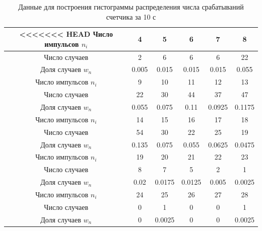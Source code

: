 \documentclass[a4paper,12pt]{article}
\begin{document}
\begin{table}[H]
\centering
\caption{Данные для построения гистограммы распределения числа срабатываний счетчика за 10 с} \label{10c}
\begin{tabular}{|c|c|c|c|c|c|}
<<<<<<< HEAD
\hline
Число импульсов $n_i$ & 4 & 5 & 6 & 7 & 8 \\
\hline
Число случаев & 2 & 6 & 6 & 6 & 22 \\
\hline
Доля случаев $w_n$ & 0.005 & 0.015 & 0.015 & 0.015 & 0.055 \\
\hline
\hline
Число импульсов $n_i$ & 9 & 10 & 11 & 12 & 13 \\
\hline
Число случаев & 22 & 30 & 44 & 37 & 47 \\
\hline
Доля случаев $w_n$ & 0.055 & 0.075 & 0.11 & 0.0925 & 0.1175 \\
\hline
\hline
Число импульсов $n_i$ & 14 & 15 & 16 & 17 & 18 \\
\hline
Число случаев & 54 & 30 & 22 & 25 & 19 \\
\hline
Доля случаев $w_n$ & 0.135 & 0.075 & 0.055 & 0.0625 & 0.0475 \\
\hline
\hline
Число импульсов $n_i$ & 19 & 20 & 21 & 22 & 23 \\
\hline
Число случаев & 8 & 7 & 5 & 2 & 1 \\
\hline
Доля случаев $w_n$ & 0.02 & 0.0175 & 0.0125 & 0.005 & 0.0025 \\
\hline
\hline
Число импульсов $n_i$ & 24 & 25 & 26 & 27 & 28\\
\hline
Число случаев & 0 & 1 & 0 & 0 & 1\\
\hline
Доля случаев $w_n$ & 0 & 0.0025 & 0 & 0 & 0.0025\\
\hline


\end{tabular}
\end{table}
\end{document}
